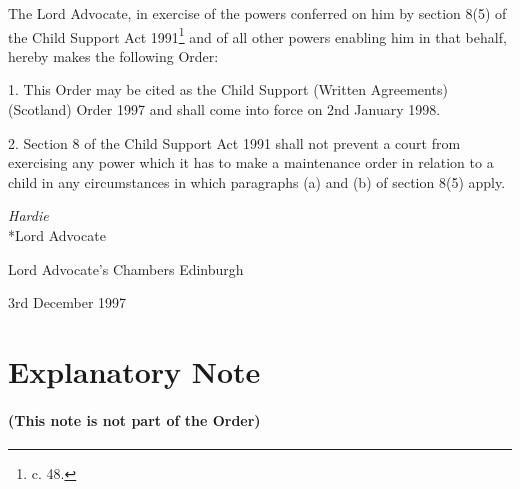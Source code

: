 \documentclass[12pt,a4paper]{article}
\title{\regstitle}
\author{S.I. 1997 No. 2943 (S.188)}
\date{Made 3rd December 1997\\Laid before Parliament 12th December 1997\\Coming into force 2nd January 1998}
\begin{document}
\maketitle

\noindent
The Lord Advocate, in exercise of the powers conferred on him by section 8(5) of the Child Support Act 1991\footnote{ c. 48.} and of all other powers enabling him in that behalf, hereby makes the following Order:

%
%

\bigskip

\setcounter{secnumdepth}{-2}

1.  This Order may be cited as the Child Support (Written Agreements) (Scotland) Order 1997 and shall come into force on 2nd January 1998.

\medskip

2.  Section 8 of the Child Support Act 1991 shall not prevent a court from exercising any power which it has to make a maintenance order in relation to a child in any circumstances in which paragraphs (a) and (b) of section 8(5) apply.

%
%
%
%

\bigskip


{\raggedleft
\emph{Hardie}\\*Lord Advocate%

}

Lord Advocate’s Chambers Edinburgh

3rd December 1997

\small

\part{Explanatory Note}

\renewcommand\parthead{--- Explanatory Note}

\subsection*{(This note is not part of the Order)}
\end{document}
